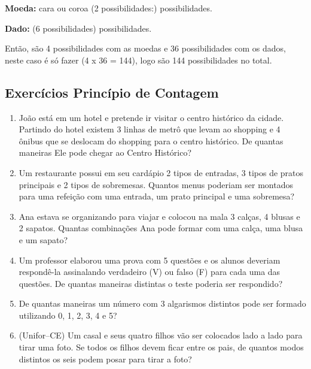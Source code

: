 \begin{multicols*}{2}
\textbf{Moeda:} cara ou coroa (2 possibilidades:)   possibilidades.

\textbf{Dado:}  (6 possibilidades)  possibilidades.

Então, são 4 possibilidades com as moedas e 36 possibilidades com os dados, neste caso é só fazer (4 x 36 = 144), logo são 144 possibilidades no total. 

		\subsection{Exercícios Princípio de Contagem}
		
		\begin{enumerate}
		
		\item João está em um hotel e pretende ir visitar o centro histórico da cidade. Partindo do hotel existem 3 linhas de metrô que levam ao shopping e 4 ônibus que se deslocam do shopping para o centro histórico. De quantas maneiras Ele pode chegar ao Centro Histórico?
		
		\item Um restaurante possui em seu cardápio 2 tipos de entradas, 3 tipos de pratos principais e 2 tipos de sobremesas. Quantos menus poderiam ser montados para uma refeição com uma entrada, um prato principal e uma sobremesa?
		
		\item Ana estava se organizando para viajar e colocou na mala 3 calças, 4 blusas e 2 sapatos. Quantas combinações Ana pode formar com uma calça, uma blusa e um sapato?
		
		\item Um professor elaborou uma prova com 5 questões e os alunos deveriam respondê-la assinalando verdadeiro (V) ou falso (F) para cada uma das questões. De quantas maneiras distintas o teste poderia ser respondido?
		
		\item De quantas maneiras um número com 3 algarismos distintos pode ser formado utilizando 0, 1, 2, 3, 4 e 5?
		
		\item (Unifor–CE) Um casal e seus quatro filhos vão ser colocados lado a lado para tirar uma foto. Se todos os filhos devem ficar entre os pais, de quantos modos distintos os seis podem posar para tirar a foto?


\end{enumerate}
\end{multicols*}
